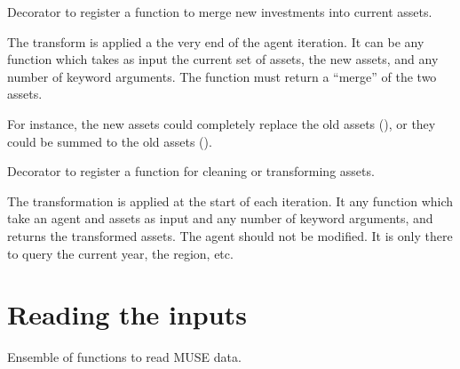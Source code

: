 \documentclass[letterpaper,10pt,english]{sphinxmanual}
\begin{document}
\begin{fulllineitems}
\label{\detokenize{api:muse.hooks.register_final_asset_transform}}
Decorator to register a function to merge new investments into current assets.

The transform is applied a the very end of the agent iteration. It can be any
function which takes as input the current set of assets, the new assets, and any
number of keyword arguments. The function must return a “merge” of the two assets.

For instance, the new assets could completely replace the old assets
(), or they could be summed to the old assets
().

\end{fulllineitems}


\begin{fulllineitems}
\label{\detokenize{api:muse.hooks.register_initial_asset_transform}}
Decorator to register a function for cleaning or transforming assets.

The transformation is applied at the start of each iteration. It any function which
take an agent and assets as input and any number of keyword arguments, and returns
the transformed assets. The agent should not be modified. It is only there to query
the current year, the region, etc.

\end{fulllineitems}



\section{Reading the inputs}
\label{\detokenize{api:module-muse.readers.toml}}\label{\detokenize{api:reading-the-inputs}}
Ensemble of functions to read MUSE data.
\end{document}
